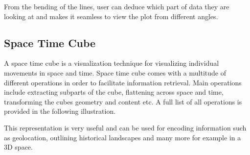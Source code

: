 \documentclass[twocolumn]{article}
\begin{document}
            From the bending of the lines, user can deduce which part of data they are looking at and makes it seamless to view the plot from different angles.
            
            \subsection{Space Time Cube}
            
            A space time cube is a visualization technique for visualizing individual movements in space and time. Space time cube comes with a multitude of different operations in order to facilitate information retrieval. Main operations include extracting subparts of the cube, flattening across space and time, transforming the cubes geometry and content etc\cite{space-time-cube}. A full list of all operations is provided in the following illustration. \newline
            
            \noindent
            \begin{minipage}{\linewidth}
            \end{minipage}
            
            This representation is very useful and can be used for encoding information such as geolocation, outlining historical landscapes and many more\cite{space-time-cube} for example in a 3D space.
            
\end{document}
